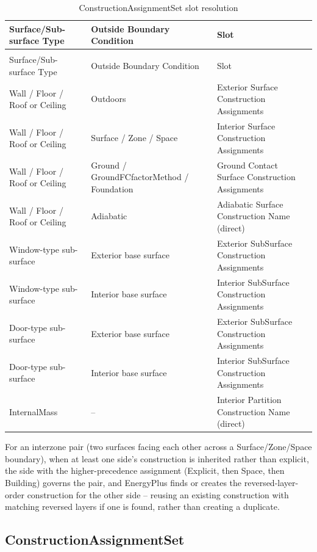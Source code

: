 \begin{longtable}[c]{@{}>{\raggedright}p{1.6in}>{\raggedright}p{1.7in}>{\raggedright\arraybackslash}p{2.6in}@{}}
    \caption{ConstructionAssignmentSet slot resolution \label{table:constructionassignmentset-slot-resolution}} \tabularnewline
    \toprule
    Surface/Sub-surface Type & Outside Boundary Condition & Slot \tabularnewline
    \midrule
    \endfirsthead

    \caption[]{ConstructionAssignmentSet slot resolution} \tabularnewline
    \toprule
    Surface/Sub-surface Type & Outside Boundary Condition & Slot \tabularnewline
    \midrule
    \endhead

    Wall / Floor / Roof or Ceiling & Outdoors & Exterior Surface Construction Assignments \tabularnewline
    Wall / Floor / Roof or Ceiling & Surface / Zone / Space & Interior Surface Construction Assignments \tabularnewline
    Wall / Floor / Roof or Ceiling & Ground / GroundFCfactorMethod / Foundation & Ground Contact Surface Construction Assignments \tabularnewline
    Wall / Floor / Roof or Ceiling & Adiabatic & Adiabatic Surface Construction Name (direct) \tabularnewline
    Window-type sub-surface & Exterior base surface & Exterior SubSurface Construction Assignments \tabularnewline
    Window-type sub-surface & Interior base surface & Interior SubSurface Construction Assignments \tabularnewline
    Door-type sub-surface & Exterior base surface & Exterior SubSurface Construction Assignments \tabularnewline
    Door-type sub-surface & Interior base surface & Interior SubSurface Construction Assignments \tabularnewline
    InternalMass & -- & Interior Partition Construction Name (direct) \tabularnewline
    \bottomrule
\end{longtable}

For an interzone pair (two surfaces facing each other across a Surface/Zone/Space boundary), when at least one side's construction is inherited rather than explicit, the side with the higher-precedence assignment (Explicit, then Space, then Building) governs the pair, and EnergyPlus finds or creates the reversed-layer-order construction for the other side -- reusing an existing construction with matching reversed layers if one is found, rather than creating a duplicate.

\subsection{ConstructionAssignmentSet}\label{constructionassignmentset}

